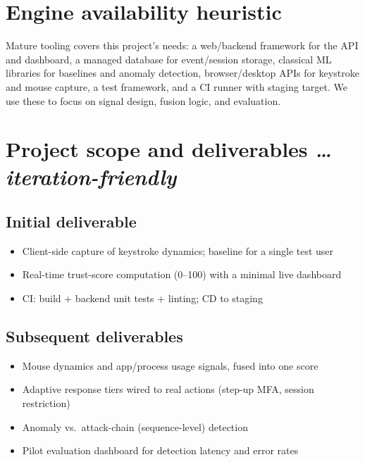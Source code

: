 \documentclass[11pt,a4paper]{article}
\newcommand{\BvrHint}[1]{%
  {\normalfont\normalsize\itshape\hfill #1}}
\begin{document}
\section{Engine availability heuristic} 
Mature tooling covers this project's needs: a web/backend framework 
for the API and dashboard, a managed database for event/session 
storage, classical ML libraries for baselines and anomaly detection, 
browser/desktop APIs for keystroke and mouse capture, a test 
framework, and a CI runner with staging target. We use these to focus 
on signal design, fusion logic, and evaluation. 
 
\section{Project scope and deliverables%
\BvrHint{\ldots iteration-friendly}} 
\subsection{Initial deliverable} 
\begin{itemize}[leftmargin=0.7cm] 
    \item Client-side capture of keystroke dynamics; baseline for a single test user 
    \item Real-time trust-score computation (0--100) with a minimal live dashboard 
    \item CI: build + backend unit tests + linting; CD to staging 
\end{itemize} 
 
\subsection{Subsequent deliverables} 
\begin{itemize}[leftmargin=0.7cm] 
    \item Mouse dynamics and app/process usage signals, fused into one score 
    \item Adaptive response tiers wired to real actions (step-up MFA, session restriction) 
    \item Anomaly vs.\ attack-chain (sequence-level) detection 
    \item Pilot evaluation dashboard for detection latency and error rates 
\end{itemize} 
 
\end{document}
